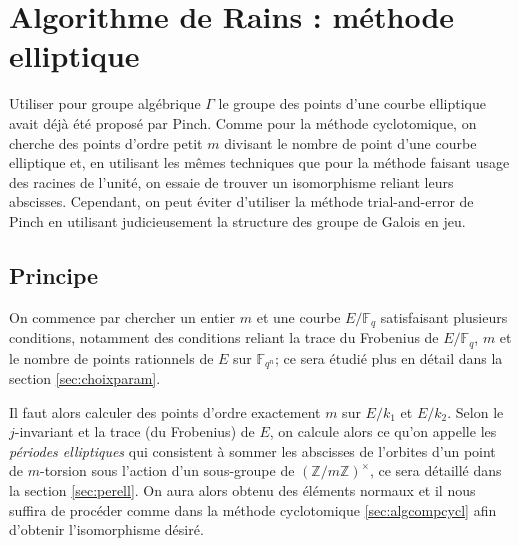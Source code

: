 \documentclass[a4paper]{article} %
\numberwithin{section}{part}
\numberwithin{equation}{section}
\newcommand\zmodninv[1]{(\mathbb{Z}/#1\mathbb{Z})^{\times}}
\newcommand\GF[1]{\mathbb{F}_{#1}}
\begin{document}
\section{Algorithme de Rains : méthode elliptique}
Utiliser pour groupe algébrique $\Gamma$ le groupe des points d'une courbe
elliptique avait déjà été proposé par Pinch\cite{Pin}. Comme pour la méthode
cyclotomique, on cherche des points d'ordre petit $m$ divisant le nombre de
point d'une courbe elliptique et, en utilisant les mêmes techniques que pour la
méthode faisant usage des racines de l'unité, on essaie de trouver un
isomorphisme reliant leurs abscisses. Cependant, on peut éviter d'utiliser la
méthode trial-and-error de Pinch en utilisant judicieusement la structure des
groupe de Galois en jeu. 
\subsection{Principe}
On commence par chercher un entier $m$ et une courbe $E/\GF{q}$ satisfaisant
plusieurs conditions, notamment des conditions reliant la trace du Frobenius de
$E/\GF{q}$, $m$ et le nombre de points rationnels de $E$ sur $\GF{q^n}$; ce sera
étudié plus en détail dans la section \ref{sec:choixparam}.\par
Il faut alors calculer des points d'ordre exactement $m$ sur $E/k_1$ et $E/k_2$.
Selon le $j$-invariant et la trace (du Frobenius) de $E$, on calcule alors  
ce qu'on appelle les \emph{périodes elliptiques} qui consistent à sommer les 
abscisses de l'orbites d'un point de $m$-torsion sous l'action d'un
sous-groupe de $\zmodninv{m}$, ce sera détaillé dans la section
\ref{sec:perell}. On aura alors obtenu des éléments normaux et il nous suffira 
de procéder comme dans la méthode cyclotomique \ref{sec:algcompcycl} afin
d'obtenir l'isomorphisme désiré.
\end{document}
